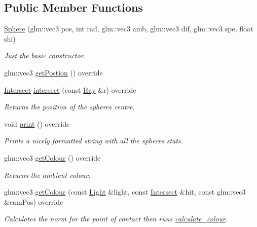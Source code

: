 \subsection*{Public Member Functions}
\begin{DoxyCompactItemize}
\item 
\mbox{\hyperlink{class_sphere_ac5331c3b7a05c78676a39ea7d30791ca}{Sphere}} (glm\+::vec3 pos, int rad, glm\+::vec3 amb, glm\+::vec3 dif, glm\+::vec3 spe, float shi)
\begin{DoxyCompactList}\small\item\em Just the basic constructor. \end{DoxyCompactList}\item 
glm\+::vec3 \mbox{\hyperlink{class_sphere_a6e2f290f9632e8da3d8dd90dc74997ac}{get\+Postion}} () override
\item 
\mbox{\hyperlink{struct_intersect}{Intersect}} \mbox{\hyperlink{class_sphere_a8d2ea6e36b5c23330e08861bb723e2a4}{intersect}} (const \mbox{\hyperlink{struct_ray}{Ray}} \&r) override
\begin{DoxyCompactList}\small\item\em Returns the position of the sphere\textquotesingle{}s centre. \end{DoxyCompactList}\item 
void \mbox{\hyperlink{class_sphere_a95537121c5308b7b250f4a53171303ef}{print}} () override
\begin{DoxyCompactList}\small\item\em Prints a nicely formatted string with all the sphere\textquotesingle{}s stats. \end{DoxyCompactList}\item 
glm\+::vec3 \mbox{\hyperlink{class_sphere_abc6455e04b563fb57b91f12183fa4d18}{get\+Colour}} () override
\begin{DoxyCompactList}\small\item\em Returns the ambient colour. \end{DoxyCompactList}\item 
glm\+::vec3 \mbox{\hyperlink{class_sphere_a0ce51c06baaea1c35129b17b5132ff58}{get\+Colour}} (const \mbox{\hyperlink{class_light}{Light}} \&light, const \mbox{\hyperlink{struct_intersect}{Intersect}} \&hit, const glm\+::vec3 \&cam\+Pos) override
\begin{DoxyCompactList}\small\item\em Calculates the norm for the point of contact then runs \mbox{\hyperlink{util_8h_ae9aaa22b1b1c0249f8617f45eb99ad55}{calculate\+\_\+colour}}. \end{DoxyCompactList}\end{DoxyCompactItemize}


